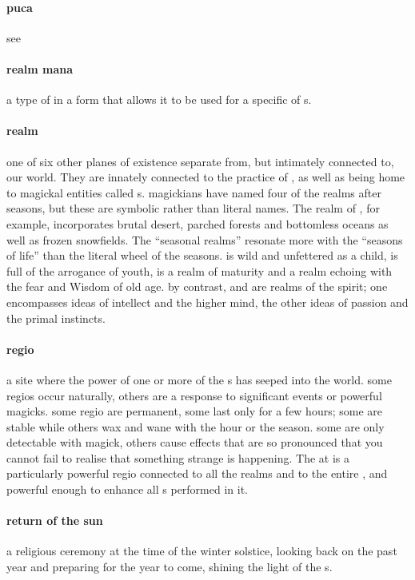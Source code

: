 \paragraph{puca} see 
\paragraph{realm mana} a type of  in a form that allows it to be used for a specific  of s.
\paragraph{realm} one of six other planes of existence separate from, but intimately connected to, our world. They are innately connected to the practice of , as well as being home to magickal entities called s. magickians have named four of the realms after seasons, but these are symbolic rather than literal names. The realm of , for example, incorporates brutal desert, parched forests and bottomless oceans as well as frozen snowfields. The “seasonal realms” resonate more with the “seasons of life” than the literal wheel of the seasons.  is wild and unfettered as a child,  is full of the arrogance of youth,  is a realm of maturity and  a realm echoing with the fear and Wisdom of old age. by contrast,  and  are realms of the spirit; one encompasses ideas of intellect and the higher mind, the other ideas of passion and the primal instincts.
\paragraph{regio} a site where the power of one or more of the s has seeped into the world. some regios occur naturally, others are a response to significant events or powerful magicks. some regio are permanent, some last only for a few hours; some are stable while others wax and wane with the hour or the season. some are only detectable with magick, others cause effects that are so pronounced that you cannot fail to realise that something strange is happening. The  at  is a particularly powerful regio connected to all the realms and to the entire , and powerful enough to enhance all s performed in it.
\paragraph{return of the sun} a religious ceremony at the time of the winter solstice, looking back on the past year and preparing for the year to come, shining the light of the s.
